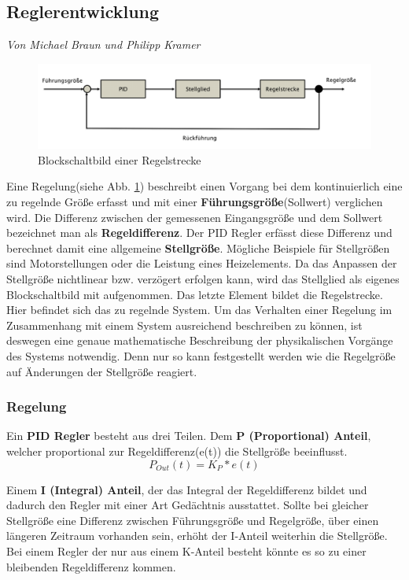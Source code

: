 \documentclass[12pt,a4paper,bibliography=totoc,listof=totoc]{scrartcl}
\begin{document}
\subsection{Reglerentwicklung}
\textit{Von Michael Braun und Philipp Kramer}\newline

\begin{figure}[htbp]
	\centering
	\includegraphics[scale = 0.4]{pics/Regelung}
	\caption{Blockschaltbild einer Regelstrecke}
	\label{Regelung}
\end{figure}

Eine Regelung(siehe Abb. \ref{Regelung}) beschreibt einen Vorgang bei dem kontinuierlich eine zu regelnde Größe erfasst und mit einer \textbf{Führungsgröße}(Sollwert) verglichen wird.
Die Differenz zwischen der gemessenen Eingangsgröße und dem Sollwert bezeichnet man als \textbf{Regeldifferenz}. 
Der PID Regler erfässt diese Differenz und berechnet damit eine allgemeine \textbf{Stellgröße}.
Mögliche Beispiele für Stellgrößen sind Motorstellungen oder die Leistung eines Heizelements.
Da das Anpassen der Stellgröße nichtlinear bzw. verzögert erfolgen kann, wird das Stellglied als eigenes Blockschaltbild mit aufgenommen. 
Das letzte Element bildet die Regelstrecke. Hier befindet sich das zu regelnde System. Um das Verhalten einer Regelung im Zusammenhang mit einem System ausreichend beschreiben zu können, ist deswegen eine genaue mathematische Beschreibung der physikalischen Vorgänge des Systems notwendig. Denn nur so kann festgestellt werden wie die Regelgröße auf Änderungen der Stellgröße reagiert.

\subsubsection{Regelung}
Ein \textbf{PID Regler} besteht aus drei Teilen.\newline
Dem \textbf{P (Proportional) Anteil}, welcher proportional zur Regeldifferenz(e(t)) die Stellgröße beeinflusst.
\begin{equation} 
P_{Out}(t) = K_P*e(t)
\end{equation}

Einem \textbf{I (Integral) Anteil}, der das Integral der Regeldifferenz bildet und dadurch den Regler mit einer Art Gedächtnis ausstattet. Sollte bei gleicher Stellgröße eine Differenz zwischen Führungsgröße und Regelgröße, über einen längeren Zeitraum vorhanden sein, erhöht der I-Anteil weiterhin die Stellgröße. Bei einem Regler der nur aus einem K-Anteil besteht könnte es so zu einer bleibenden Regeldifferenz kommen.
\end{document}
